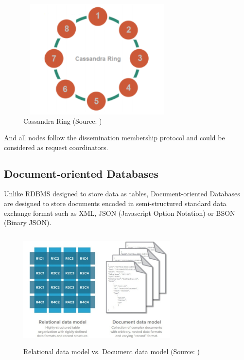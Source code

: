 \begin{figure}[H]
	\includegraphics[height=6cm, width=8cm]{../../images/ring.png}
	\caption{Cassandra Ring (Source: \cite{DBLP:journals/corr/abs-1712-04344})}
\end{figure}

 And all nodes follow the dissemination membership protocol and could be considered as request coordinators\cite{DBLP:journals/corr/abs-1712-04344}. 





\subsection{Document-oriented Databases}

Unlike RDBMS designed to store data as tables, Document-oriented Databases are designed to store documents encoded in semi-structured standard data exchange
format such as XML, JSON (Javascript Option Notation) or BSON (Binary JSON)\cite{DBLP:journals/corr/MoniruzzamanH13}.

\begin{figure}[H]
	\includegraphics[height=6cm, width=8cm]{../../images/vs.png}
	\caption{Relational data model vs. Document data model (Source: \cite{DBLP:journals/corr/MoniruzzamanH13})}
\end{figure}


